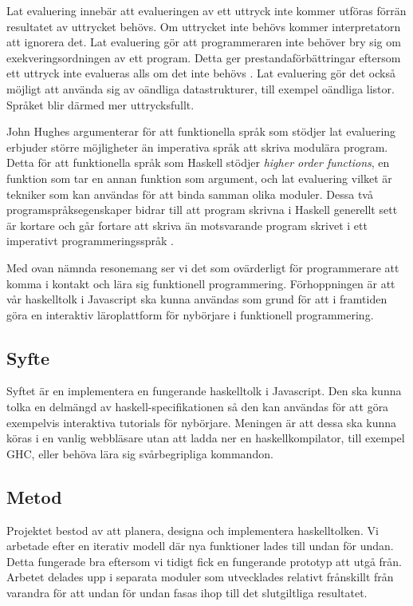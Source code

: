 Lat evaluering innebär att evalueringen av ett uttryck inte kommer utföras förrän resultatet av uttrycket behövs. Om uttrycket inte behövs  kommer interpretatorn att ignorera det. 
Lat evaluering gör att programmeraren inte behöver bry sig om exekveringsordningen av ett program. Detta ger prestandaförbättringar eftersom ett uttryck inte evalueras alls om det inte behövs \citep{hudak89}.
Lat evaluering gör det också möjligt att använda sig av oändliga datastrukturer, till exempel oändliga listor. Språket blir därmed mer uttrycksfullt. 

John Hughes argumenterar för att  funktionella språk som stödjer lat evaluering erbjuder större möjligheter än imperativa språk att skriva modulära program. Detta för att funktionella språk som Haskell stödjer \emph{higher order functions}, en funktion som tar en annan funktion som argument, och lat evaluering vilket är tekniker som kan användas för att binda samman olika moduler.
Dessa två programspråksegenskaper bidrar till att program skrivna i Haskell generellt sett är kortare och går fortare att skriva än motsvarande program skrivet i ett imperativt programmeringsspråk \citep{why}.

Med ovan nämnda resonemang ser vi det som ovärderligt för programmerare att komma i kontakt och lära sig funktionell programmering. 
Förhoppningen är att vår haskelltolk i Javascript ska kunna användas som grund för att i framtiden göra en interaktiv läroplattform för nybörjare i funktionell programmering. 


\subsection{Syfte}
Syftet är en implementera en fungerande haskelltolk i Javascript. Den ska kunna tolka en delmängd av haskell-specifikationen så den kan användas för att göra exempelvis interaktiva tutorials för nybörjare.
Meningen är att dessa ska kunna köras i en vanlig webbläsare utan att ladda ner en haskellkompilator, till exempel GHC, eller behöva lära sig svårbegripliga kommandon.

\subsection{Metod}
Projektet bestod av att planera, designa och implementera haskelltolken. Vi arbetade efter en iterativ modell där nya funktioner lades till undan för undan. Detta fungerade bra eftersom vi tidigt fick en fungerande prototyp att utgå från. Arbetet delades upp i separata moduler som utvecklades relativt frånskillt från varandra för att undan för undan fasas ihop till det slutgiltliga resultatet. 


